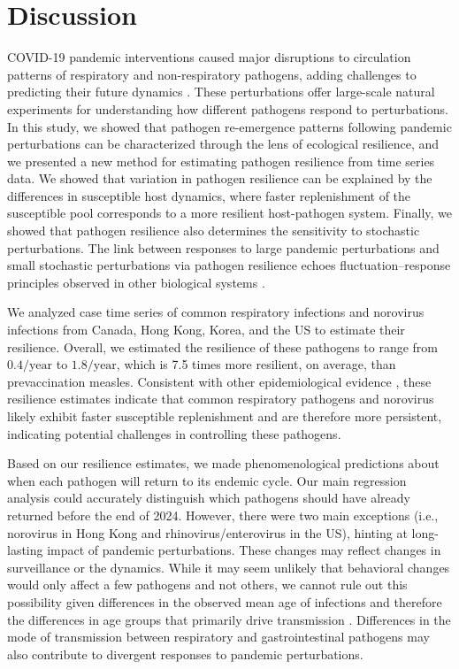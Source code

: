 \documentclass[12pt]{article}
\begin{document}
\section*{Discussion}

COVID-19 pandemic interventions caused major disruptions to circulation patterns of respiratory and non-respiratory pathogens, adding challenges to predicting their future dynamics \citep{baker2020impact,gomez2021uncertain,koltai2022determinants,park2024predicting}.
These perturbations offer large-scale natural experiments for understanding how different pathogens respond to perturbations.
In this study, we showed that pathogen re-emergence patterns following pandemic perturbations can be characterized through the lens of ecological resilience, and we presented a new method for estimating pathogen resilience from time series data.
We showed that variation in pathogen resilience can be explained by the differences in susceptible host dynamics, where faster replenishment of the susceptible pool corresponds to a more resilient host-pathogen system.
Finally, we showed that pathogen resilience also determines the sensitivity to stochastic perturbations.
The link between responses to large pandemic perturbations and small stochastic perturbations via pathogen resilience echoes fluctuation–response principles observed in other biological systems \citep{park2010interdependence}.

We analyzed case time series of common respiratory infections and norovirus infections from Canada, Hong Kong, Korea, and the US to estimate their resilience.
Overall, we estimated the resilience of these pathogens to range from $0.4/\mathrm{year}$ to $1.8/\mathrm{year}$, which is 7.5 times more resilient, on average, than prevaccination measles.
Consistent with other epidemiological evidence \citep{bosis2008role,o2009symptomatic,pitzer2015environmental,edridge2020seasonal}, these resilience estimates indicate that common respiratory pathogens and norovirus likely exhibit faster susceptible replenishment and are therefore more persistent, indicating potential challenges in controlling these pathogens.

Based on our resilience estimates, we made phenomenological predictions about when each pathogen will return to its endemic cycle.
Our main regression analysis could accurately distinguish which pathogens should have already returned before the end of 2024.
However, there were two main exceptions (i.e., norovirus in Hong Kong and rhinovirus/enterovirus in the US), hinting at long-lasting impact of pandemic perturbations.
These changes may reflect changes in surveillance or the dynamics.
While it may seem unlikely that behavioral changes would only affect a few pathogens and not others, we cannot rule out this possibility given differences in the observed mean age of infections and therefore the differences in age groups that primarily drive transmission \citep{radin2014epidemiology,lv2024epidemiological}.
Differences in the mode of transmission between respiratory and gastrointestinal pathogens may also contribute to divergent responses to pandemic perturbations.
\end{document}
